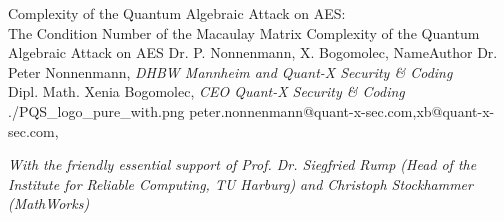 \documentclass[a4paper,11pt]{article}
\begin{document}
\setcounter{footnote}{0}
\setcounter{figure}{0}



\Aufsatz 
{Complexity of the Quantum Algebraic Attack on AES:\\
The Condition Number of the Macaulay Matrix}
{Complexity of the Quantum Algebraic Attack on AES}
{Dr. P. Nonnenmann, X. Bogomolec,}
{NameAuthor}
{Dr. Peter Nonnenmann,
{\small \textit{DHBW Mannheim and Quant-X Security {\&} Coding}} \\
Dipl. Math. Xenia Bogomolec, 
{\small \textit{CEO Quant-X Security {\&} Coding}} \\}
{./PQS_logo_pure_with.png}
{peter.nonnenmann@quant-x-sec.com,xb@quant-x-sec.com,} 

\noindent
{\small \textit{With the friendly essential support of Prof. Dr. Siegfried Rump (Head of the Institute for Reliable Computing, TU Harburg) and Christoph Stockhammer (MathWorks)}}
\end{document}
